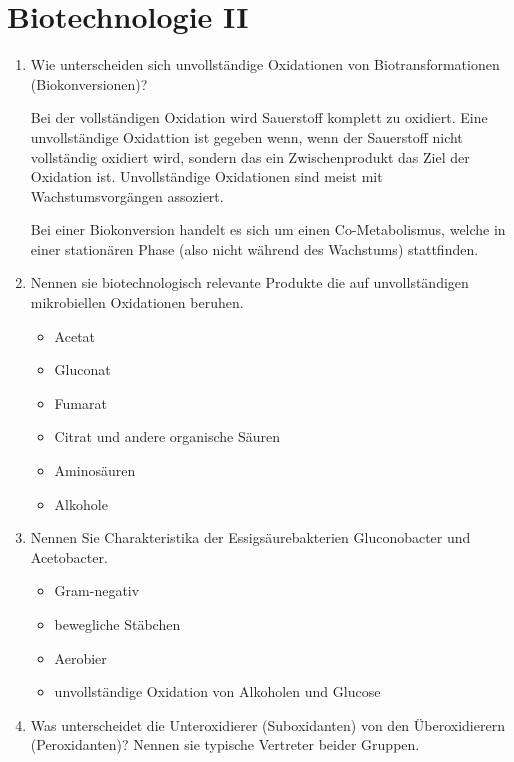
\section{Biotechnologie II}
\begin{enumerate}
	\item Wie unterscheiden sich unvollständige Oxidationen von Biotransformationen (Biokonversionen)?
		
		Bei der vollständigen Oxidation wird Sauerstoff komplett zu  oxidiert.
		Eine unvollständige Oxidattion ist gegeben wenn,
		wenn der Sauerstoff nicht vollständig oxidiert wird,
		sondern das ein Zwischenprodukt das Ziel der Oxidation ist.
		Unvollständige Oxidationen sind meist mit Wachstumsvorgängen assoziert.
		
		Bei einer Biokonversion handelt es sich um einen Co-Metabolismus,
		welche in einer stationären Phase (also nicht während des Wachstums) stattfinden.
		
	\item Nennen sie biotechnologisch relevante Produkte die auf unvollständigen mikrobiellen Oxidationen beruhen.
		
		\begin{itemize}
			\item Acetat
			\item Gluconat
			\item Fumarat
			\item Citrat und andere organische Säuren
			\item Aminosäuren
			\item Alkohole
		\end{itemize}
		
	\item Nennen Sie Charakteristika der Essigsäurebakterien Gluconobacter und Acetobacter.
	
		\begin{itemize}
			\item Gram-negativ
			\item bewegliche Stäbchen
			\item Aerobier
			\item unvollständige Oxidation von Alkoholen und Glucose
		\end{itemize}
			
	\item Was unterscheidet die Unteroxidierer (Suboxidanten) von den Überoxidierern (Peroxidanten)? Nennen sie typische Vertreter beider Gruppen.
	

\end{enumerate}
